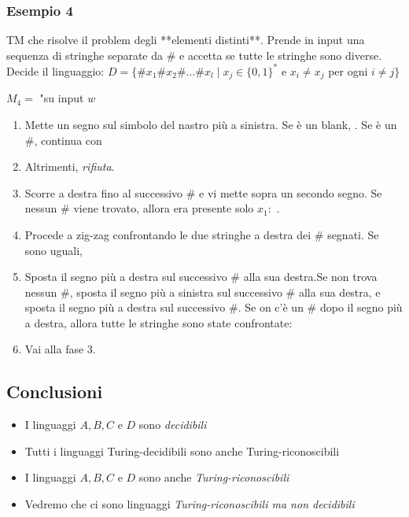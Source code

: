 \subsubsection{Esempio 4}
TM che risolve il problem degli **elementi distinti**. Prende in input una sequenza di stringhe separate da $\#$ e accetta se tutte le stringhe sono diverse. 
Decide il linguaggio:
$D=\{\#x_1\#x_2\#\dots\#x_l\mid x_j\in \{0,1\}^*$ e $x_i\neq x_j$ per ogni $i\neq j\}$ 

$M_4=$ "su input $w$ 
\begin{enumerate}
	\item Mette un segno sul simbolo del nastro più a sinistra. Se è un blank, . Se è un $\#$, continua con \item Altrimenti, \textit{rifiuta}.
	\item Scorre a destra fino al successivo $\#$ e vi mette sopra un secondo segno. Se nessun $\#$ viene trovato, allora era presente solo $x_1:$ .
	\item Procede a zig-zag confrontando le due stringhe a destra dei $\#$ segnati. Se sono uguali, 
	\item Sposta il segno più a destra sul successivo $\#$ alla sua destra.Se non trova nessun $\#$, sposta il segno più a sinistra sul successivo $\#$ alla sua destra, e sposta il segno più a destra sul successivo $\#$. Se on c'è un $\#$ dopo il segno più a destra, allora tutte le stringhe sono state confrontate: 
	\item Vai alla fase 3.
\end{enumerate}

\subsection{Conclusioni}
\begin{itemize}
	\item I linguaggi $A, B, C$ e $D$ sono \textit{decidibili}
	\item Tutti i linguaggi Turing-decidibili sono anche Turing-riconoscibili
	\item I linguaggi $A,B,C$ e $D$ sono anche \textit{Turing-riconoscibili}
	\item Vedremo che ci sono linguaggi \textit{Turing-riconoscibili ma non decidibili}
\end{itemize}

